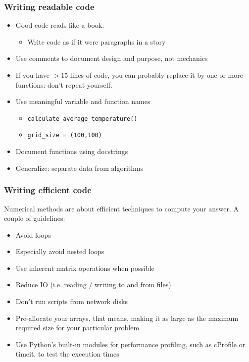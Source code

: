 \begin{frame}
  \frametitle{Writing readable code}
  \begin{itemize}
    \item Good code reads like a book.
    \begin{itemize}
      \item Write code as if it were paragraphs in a story
    \end{itemize}
    \item Use comments to document design and purpose, not mechanics
    \item If you have $>15$ lines of code, you can probably replace it by one or more functions: don't repeat yourself.
    \item Use meaningful variable and function names
    \begin{itemize}
      \item \lstinline|calculate_average_temperature()|
      \item \lstinline|grid_size = (100,100)|
    \end{itemize}
    \item Document functions using docstrings 
    \item Generalize: separate data from algorithms
  \end{itemize}
\end{frame}

\begin{frame}[fragile]
  \frametitle{Writing efficient code}
  Numerical methods are about efficient techniques to compute your answer. A couple of guidelines:
  \begin{itemize}
      \item Avoid loops
      \item Especially avoid nested loops
      \item Use inherent matrix operations when possible
      \item Reduce IO (i.e. reading / writing to and from files)
      \item Don't run scripts from network disks
      \item Pre-allocate your arrays, that means, making it as large as the maximum required size for your particular problem
      \item Use Python's built-in modules for performance profiling, such as cProfile or timeit, to test the execution times
  \end{itemize}
\end{frame}

